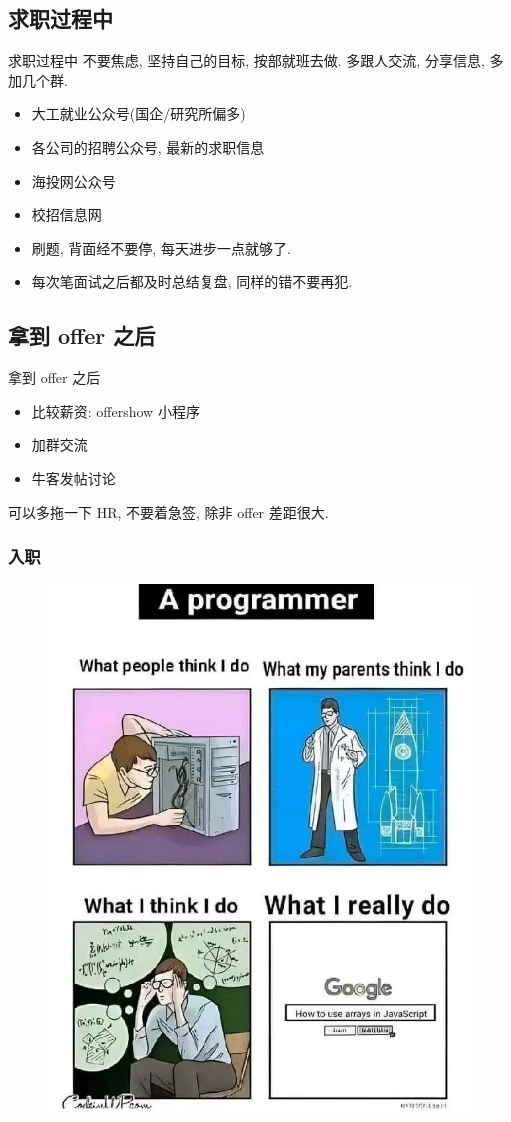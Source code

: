 \documentclass{ctexbeamer}
\begin{document}
\subsection{求职过程中}
\begin{frame}{求职过程中}
	不要焦虑, 坚持自己的目标, 按部就班去做.
	多跟人交流, 分享信息, 多加几个群.
	\begin{itemize}
		\item 大工就业公众号(国企/研究所偏多)
		\item 各公司的招聘公众号, 最新的求职信息
		\item 海投网公众号
		\item 校招信息网
	\end{itemize}

	\begin{itemize}
		\item 刷题, 背面经不要停, 每天进步一点就够了. 
		\item 每次笔面试之后都及时总结复盘, 同样的错不要再犯. 
	\end{itemize}
\end{frame}

\subsection{拿到 offer 之后}
\begin{frame}{拿到 offer 之后}
	\begin{itemize}
		\item 比较薪资: offershow 小程序
		\item 加群交流
		\item 牛客发帖讨论
	\end{itemize}
	可以多拖一下 HR, 不要着急签, 除非 offer 差距很大. 
\end{frame}

\begin{frame}
	\frametitle{入职}
	\vspace*{-1em}
	\begin{figure}\centering
		\includegraphics[width=.45\textwidth]{figures/programmer.jpg}
	\end{figure}

\end{frame}
\end{document}
